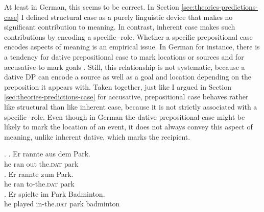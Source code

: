 \begin{sloppypar}
At least in German, this seems to be correct. In Section \ref{sec:theories-predictions-case} I defined structural case as a purely linguistic device that makes no significant contribution to meaning. In contrast, inherent case makes such contributions by encoding a specific \texttheta-role. Whether a specific prepositional case encodes aspects of meaning is an empirical issue. In German for instance, there is a tendency for dative prepositional case to mark locations or sources and for accusative to mark goals \citep[8]{zwarts2005}. Still, this relationship is not systematic, because a dative DP can encode a source \Next[a] as well as a goal \Next[b] and location \Next[c] depending on the preposition it appears with. Taken together, just like I argued in Section \ref{sec:theories-predictions-case} for accusative, prepositional case behaves rather like structural than like inherent case, because it is not strictly associated with a specific \texttheta-role. Even though in German the dative prepositional case might be likely to mark the location of an event, it does not always convey this aspect of meaning, unlike inherent dative, which marks the recipient.\end{sloppypar}

\ex. \ag. Er rannte aus dem Park.\\
he ran  out the.\textsc{dat} park\\
  
\bg. Er rannte zum Park.\\
he ran to-the.\textsc{dat} park\\
 
\cg. Er spielte im Park Badminton.\\
he played in-the.\textsc{dat} park badminton\\

